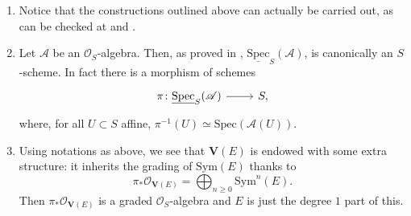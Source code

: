 \documentclass[../Main]{subfiles}
\begin{document}
\begin{rem}[]\leavevmode\vspace{-.2\baselineskip}
\begin{enumerate}
	\item Notice that the constructions outlined above can actually be carried out,
		as can be checked at 
		\cite[\href{https://stacks.math.columbia.edu/tag/01LL}{Section 01LL}]{SP}
		and
		\cite[\href{https://stacks.math.columbia.edu/tag/01M1}{Section 01M1}]{SP}.

	\item Let $\mathscr{A}$ be an $\mathcal{O}_{ S }$-algebra. 
		Then, as proved in 
		\cite[\href{https://stacks.math.columbia.edu/tag/01LP}{Lemma 01LP}]{SP},
		$\underline{\mathrm{Spec}}_S(\mathscr{A})$, is canonically an $S$-scheme.
		In fact there is a morphism of schemes
		\begin{equation*}
		\begin{tikzcd}[row sep = 0ex
			,/tikz/column 1/.append style={anchor=base east}
			,/tikz/column 2/.append style={anchor=base west}]
			\pi\colon \underline{\mathrm{Spec}}_S(\mathscr{A})
			\arrow[r, "", rightarrow] &
			S
		,\end{tikzcd}
		\end{equation*} 
		where, for all $U \subset S$ affine, $\pi^{-1}(U) \simeq \mathrm{Spec}(\mathscr{A}(U))$.

	\item Using notations as above, we see that $\mathbf{V}(E)$ is endowed with
		some extra structure: it inherits the grading of $\mathrm{Sym}(E)$
		thanks to
		\begin{equation*}
			\pi_* \mathcal{O}_{ \mathbf{V}(E) } =
			\bigoplus_{n \geq 0} \mathrm{Sym}^n(E)
		.\end{equation*}
		Then $\pi_* \mathcal{O}_{ \mathbf{V}(E) }$ is a graded
		$\mathcal{O}_{ S }$-algebra and $E$ is just the degree $1$ part
		of this.
\end{enumerate}
\end{rem}
\end{document}
